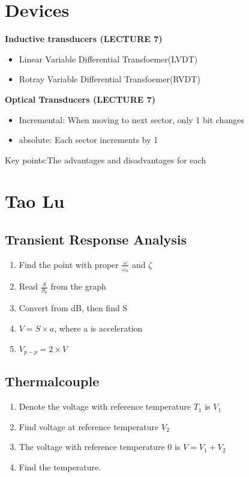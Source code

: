 \documentclass{article}
\begin{document}
	\section{Devices}
	\textbf{Inductive transducers (LECTURE 7)}
	\begin{itemize}
		\item Linear Variable Differential Transfoemer(LVDT)
		\item Rotray Variable Differential Transfoemer(RVDT)
	\end{itemize}
	
	\textbf{Optical Transducers (LECTURE 7)}
	
	\begin{itemize}
		\item Incremental: When moving to next sector, only 1 bit changes
		\item absolute: Each sector increments by 1
	\end{itemize}
	\noindent Key points:The advantages and disadvantages for each
	\section{Tao Lu}
	\subsection{Transient Response Analysis}
	\begin{enumerate}
		\item Find the point with proper $\frac{\omega}{\omega_n}$ and $\zeta$
		\item Read $\frac{S}{S_0}$ from the graph
		\item Convert from dB, then find S
		\item $V = S \times a$, where a is acceleration
		\item $V_{p-p} = 2\times V$
	\end{enumerate}  
	
	\subsection{Thermalcouple}
	\begin{enumerate}
		\item Denote the voltage with reference temperature $T_1$ is $V_1$
		\item Find voltage at reference temperature $V_2$
		\item The voltage with reference temperature 0 is $V = V_1 + V_2$
		\item Find the temperature.
	\end{enumerate}  
	
\end{document}
